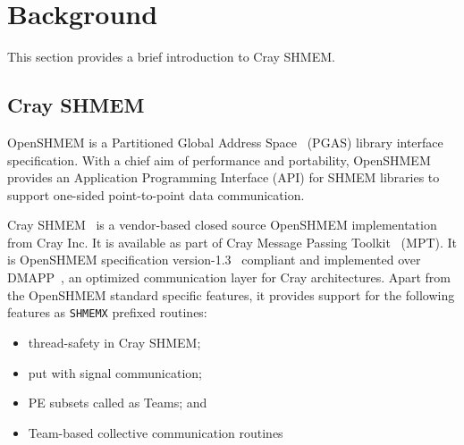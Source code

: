 \section{Background}
\label{src:bground}

This section provides a brief introduction to Cray SHMEM.%

\subsection{Cray SHMEM}
\label{src:bg/crayshmem}
OpenSHMEM is a Partitioned Global Address Space~\cite{pgas} (PGAS) library
interface specification.%
With a chief aim of performance and portability, OpenSHMEM
provides an Application Programming Interface (API) for SHMEM libraries
to support one-sided point-to-point data communication.

Cray SHMEM~\cite{csma} is a vendor-based
closed source OpenSHMEM implementation from Cray Inc.
It is available as part of
Cray Message Passing Toolkit~\cite{mpt} (MPT). It is OpenSHMEM
specification version-1.3~\cite{osm13} compliant and implemented over
DMAPP~\cite{dmapp}, an
optimized communication layer for Cray architectures. Apart from the OpenSHMEM standard
specific features, it provides support for the following features as \texttt{SHMEMX}
prefixed routines:
\begin{itemize}
    \item thread-safety in Cray SHMEM;
    \item put with signal communication;
    \item PE subsets called as Teams; and
    \item Team-based collective communication routines
\end{itemize}

